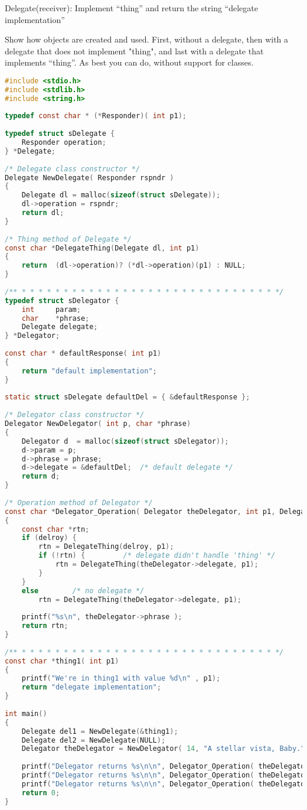 \documentclass{book}
\begin{document}
Delegate(receiver):
    Implement ``thing'' and return the string ``delegate implementation''

Show how objects are created and used. First, without a delegate, then with a delegate that does not implement "thing", and last with a delegate that implements ``thing''. 
As best you can do, without support for classes.
\begin{lstlisting}[caption={Delegation Exmaple code, C implementation},language=C]
#include <stdio.h>
#include <stdlib.h>
#include <string.h>
 
typedef const char * (*Responder)( int p1);
 
typedef struct sDelegate {
    Responder operation;
} *Delegate;
 
/* Delegate class constructor */
Delegate NewDelegate( Responder rspndr )
{
    Delegate dl = malloc(sizeof(struct sDelegate));
    dl->operation = rspndr;
    return dl;
}
 
/* Thing method of Delegate */
const char *DelegateThing(Delegate dl, int p1)
{
    return  (dl->operation)? (*dl->operation)(p1) : NULL;
}
 
/** * * * * * * * * * * * * * * * * * * * * * * * * * * * * * * */
typedef struct sDelegator {
    int     param;
    char    *phrase;
    Delegate delegate;
} *Delegator;
 
const char * defaultResponse( int p1)
{
    return "default implementation";
}
 
static struct sDelegate defaultDel = { &defaultResponse };
 
/* Delegator class constructor */
Delegator NewDelegator( int p, char *phrase)
{
    Delegator d  = malloc(sizeof(struct sDelegator));
    d->param = p;
    d->phrase = phrase;
    d->delegate = &defaultDel;	/* default delegate */
    return d;
}
 
/* Operation method of Delegator */
const char *Delegator_Operation( Delegator theDelegator, int p1, Delegate delroy)
{
    const char *rtn;
    if (delroy) {
        rtn = DelegateThing(delroy, p1);
        if (!rtn) {			/* delegate didn't handle 'thing' */
            rtn = DelegateThing(theDelegator->delegate, p1);
        }
    }
    else 		/* no delegate */
        rtn = DelegateThing(theDelegator->delegate, p1);
 
    printf("%s\n", theDelegator->phrase );
    return rtn;
}
 
/** * * * * * * * * * * * * * * * * * * * * * * * * * * * * * * */
const char *thing1( int p1)
{
    printf("We're in thing1 with value %d\n" , p1);
    return "delegate implementation";
}
 
int main()
{
    Delegate del1 = NewDelegate(&thing1);
    Delegate del2 = NewDelegate(NULL);
    Delegator theDelegator = NewDelegator( 14, "A stellar vista, Baby.");
 
    printf("Delegator returns %s\n\n", Delegator_Operation( theDelegator, 3, NULL));
    printf("Delegator returns %s\n\n", Delegator_Operation( theDelegator, 3, del1));
    printf("Delegator returns %s\n\n", Delegator_Operation( theDelegator, 3, del2));
    return 0;
}
\end{lstlisting}
\end{document}
